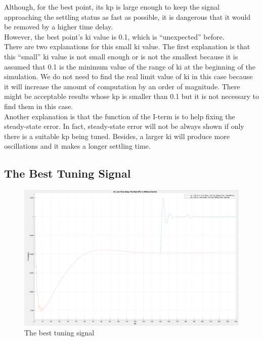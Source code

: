 \documentclass{report}
\begin{document}
Although, for the best point, its kp is large enough to keep the signal approaching the settling status as fast as possible, it is dangerous that it would be removed by a higher time delay.\\

However, the best point's ki value is 0.1, which is “unexpected” before. \\

There are two explanations for this small ki value. The first explanation is that this “small” ki value is not small enough or is not the smallest because it is assumed that 0.1 is the minimum value of the range of ki at the beginning of the simulation. We do not need to find the real limit value of ki in this case because it will increase the amount of computation by an order of magnitude. There might be acceptable results whose kp is smaller than 0.1 but it is not necessary to find them in this case. \\

Another explanation is that the function of the I-term is to help fixing the steady-state error. In fact, steady-state error will not be always shown if only there is a suitable kp being tuned. Besides, a larger ki will produce more oscillations and it makes a longer settling time. \\


\subsection{The Best Tuning Signal} %

\begin{figure}[htbp]
\centering
\includegraphics[width = .819\textwidth]{figure/4_4_2_best.png}
\caption{The best tuning signal}
\label{4_4_2_best}
\end{figure}
\end{document}
